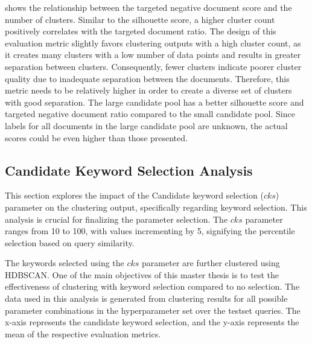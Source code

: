 
 
 shows the relationship between the targeted negative document score and the number of clusters. Similar to the silhouette score, a higher cluster count positively correlates with the targeted document ratio. The design of this evaluation metric slightly favors clustering outputs with a high cluster count, as it creates many clusters with a low number of data points and results in greater separation between clusters. Consequently, fewer clusters indicate poorer cluster quality due to inadequate separation between the documents. Therefore, this metric needs to be relatively higher in order to create a diverse set of clusters with good separation. The large candidate pool has a better silhouette score and targeted negative document ratio compared to the small candidate pool. Since labels for all documents in the large candidate pool are unknown, the actual scores could be even higher than those presented.

\subsection{Candidate Keyword Selection Analysis}
This section explores the impact of the Candidate keyword selection ($cks$) parameter on the clustering output, specifically regarding keyword selection. This analysis is crucial for finalizing the parameter selection. The $cks$ parameter ranges from 10 to 100, with values incrementing by 5, signifying the percentile selection based on query similarity. 

The keywords selected using the $cks$ parameter are further clustered using \ac{HDBSCAN}. One of the main objectives of this master thesis is to test the effectiveness of clustering with keyword selection compared to no selection. The data used in this analysis is generated from clustering results for all possible parameter combinations in the hyperparameter set over the testset queries. The x-axis represents the candidate keyword selection, and the y-axis represents the mean of the respective evaluation metrics.


